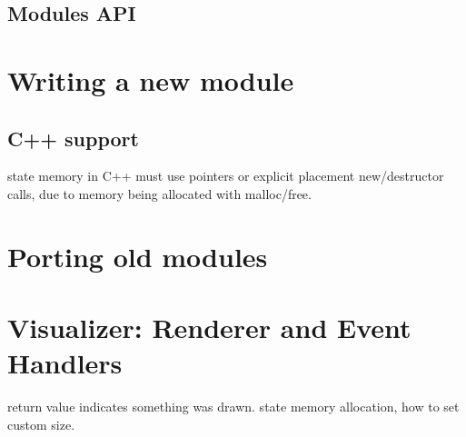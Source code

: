 \documentclass[a4paper,12pt]{report}
\begin{document}
\subsection{Modules API}

\section{Writing a new module}

\subsection{C++ support}

state memory in C++ must use pointers or explicit placement new/destructor calls, due to memory being
allocated with malloc/free.

\section{Porting old modules}

\section{Visualizer: Renderer and Event Handlers}

return value indicates something was drawn.
state memory allocation, how to set custom size.
\end{document}
